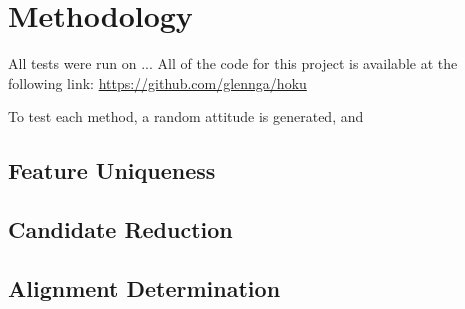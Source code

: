 \section{Methodology}
All tests were run on ...
All of the code for this project is available at the following link: 
\url{https://github.com/glennga/hoku}

To test each method, a random attitude is generated, and 

\subsection{Feature Uniqueness}

\subsection{Candidate Reduction}

\subsection{Alignment Determination}